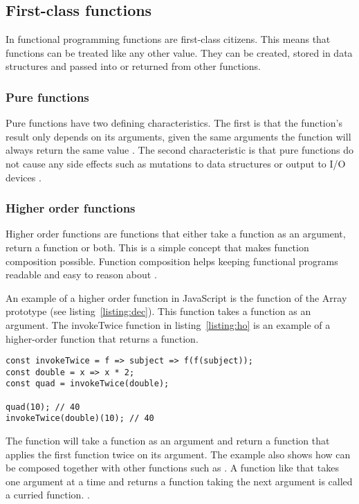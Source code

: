 \subsection{First-class functions}

In functional programming functions are first-class citizens. This means that functions can be treated like any other value. They can be created, stored in data structures and passed into or returned from other functions.

\subsubsection{Pure functions}

Pure functions have two defining characteristics. The first is that the function's result only depends on its arguments, given the same arguments the function will always return the same value \cite{intro-func}. The second characteristic is that pure functions do not cause any side effects such as mutations to data structures or output to I/O devices \cite{intro-func}.

\subsubsection{Higher order functions} %
\label{sub:fp-order}

Higher order functions are functions that either take a function as an argument, return a function or both. This is a simple concept that makes function composition possible. Function composition helps keeping functional programs readable and easy to reason about \cite{intro-func}.

An example of a higher order function in JavaScript is the  function of the Array prototype (see listing~\ref{listing:dec}). This function takes a function as an argument. The invokeTwice function in listing~\ref{listing:ho} is an example of a higher-order function that returns a function.

\begin{lstlisting}[caption=Higher order function composition,label=listing:ho]
const invokeTwice = f => subject => f(f(subject));
const double = x => x * 2;
const quad = invokeTwice(double);

quad(10); // 40
invokeTwice(double)(10); // 40
\end{lstlisting}

The  function will take a function as an argument and return a function that applies the first function twice on its argument. The example also shows how  can be composed together with other functions such as . A function like  that takes one argument at a time and returns a function taking the next argument is called a curried function. \cite{func-js}.

